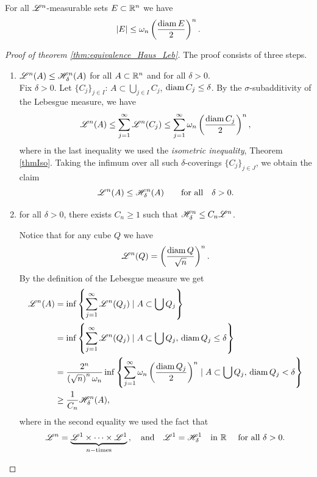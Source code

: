 \begin{theorem}
\label{thmIso}
For all $\mathscr{L}^{n}$-measurable sets $E \subset \mathbb{R}^n$ we have 
\[
|E| \leq \omega_n \left(\frac{\operatorname{diam} E}{2}\right)^n.
\]
\end{theorem}

\begin{proof}[Proof of theorem \ref{thm:equivalence_Haus_Leb}]
The proof consists of three steps.~
\begin{enumerate}
\item $\mathscr{L}^{n}(A) \leq \mathscr{H}^{n}_{\delta}(A)$ for all $A \subset \mathbb{R}^n$ and for all $\delta > 0$.
\\
Fix $\delta > 0$. Let $\{C_j\}_{j\in I}$: $A \subset \bigcup_{j\in I} C_j$, $\operatorname{diam}
C_j \leq \delta$. By the $\sigma$-subadditivity of the Lebesgue measure, we have
\[
\mathscr{L}^{n}(A) \leq \sum_{j=1}^\infty \mathscr{L}^{n}(C_j) \leq
\sum_{j=1}^\infty \omega_n \left(\frac{\operatorname{diam} C_j}{2}\right)^n,
\]
where in the last inequality we used the \emph{isometric
inequality}, Theorem \ref{thmIso}. Taking the
infimum over all such $\delta$-coverings $\{C_j\}_{j \in J}$, we obtain the claim
\[
\mathscr{L}^{n}(A) \leq \mathscr{H}^{n}_\delta (A) \qquad \text{for all} \quad
\delta > 0.
\]
\item for all $\delta > 0$, there exists $C_{n} \geq 1$ such that $\mathscr{H}^{n}_{\delta} \leq C_n \mathscr{L}^{n}$.

Notice that for any cube $Q$ we have
\begin{equation*}
\mathscr{L}^{n}(Q) = \left(\frac{ \operatorname{diam} Q}{\sqrt{n}}\right)^n.
\end{equation*}
By the definition of the Lebesgue measure we get
\[
\begin{aligned}
\mathscr{L}^{n}(A) 
&= \inf\left\{ \sum_{j=1}^\infty \mathscr{L}^{n}(Q_j) \mid A
\subset \bigcup Q_j\right\}
\\& = \inf\left\{ \sum_{j=1}^\infty \mathscr{L}^{n}(Q_j) \mid A
\subset \bigcup Q_j,\, \operatorname{diam} Q_j \le \delta \right\}
\\& = \frac{2^n}{\left(\sqrt{n}\right)^n \omega_n} \inf
\left\{\sum_{j=1}^\infty \omega_n \left(\frac{\operatorname{diam} Q_j}{2}\right)^n \mid 
A \subset \bigcup Q_j,\, \operatorname{diam} Q_j < \delta\right\}
\\&\geq \frac{1}{C_n} \mathscr{H}^{n}_\delta (A),
\end{aligned}
\]
where in the second equality we used the fact that 
\[
\mathscr{L}^{n} = \underbrace{\mathscr{L}^{1} \times \dots \times \mathscr{L}^{1}}_{n-\text{times}}\,,
\quad \text{and} \quad
\mathscr{L}^{1} = \mathscr{H}^{1}_\delta \quad \text{in } \mathbb{R} \quad \text{ for all } \delta > 0.
\]


\end{enumerate}
\end{proof}
